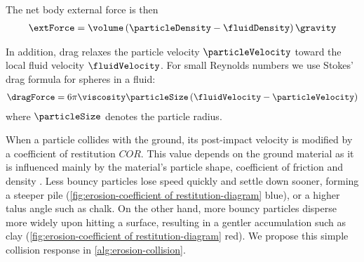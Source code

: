 The net body external force is then
\begin{align}
\label{eq:erosion-bodyforce}
    \extForce = \volume \left(\particleDensity - \fluidDensity\right)\gravity
\end{align}

In addition, drag relaxes the particle velocity $\particleVelocity$ toward the local fluid velocity $\fluidVelocity$. For small Reynolds numbers we use Stokes' drag formula for spheres in a fluid:
\begin{align}
    \label{eq:erosion-drag}
    \dragForce = 6\pi \viscosity \particleSize \left(\fluidVelocity - \particleVelocity\right)
\end{align}
where $\particleSize$ denotes the particle radius.

    
When a particle collides with the ground, its post-impact velocity is modified by a coefficient of restitution $COR$. This value depends on the ground material as it is influenced mainly by the material's particle shape, coefficient of friction and density \cite{Yan2020}. Less bouncy particles lose speed quickly and settle down sooner, forming a steeper pile (\cref{fig:erosion-coefficient of restitution-diagram} blue), or a higher talus angle such as chalk. On the other hand, more bouncy particles disperse more widely upon hitting a surface, resulting in a gentler accumulation such as clay (\cref{fig:erosion-coefficient of restitution-diagram} red). We propose this simple collision response in \cref{alg:erosion-collision}. 

